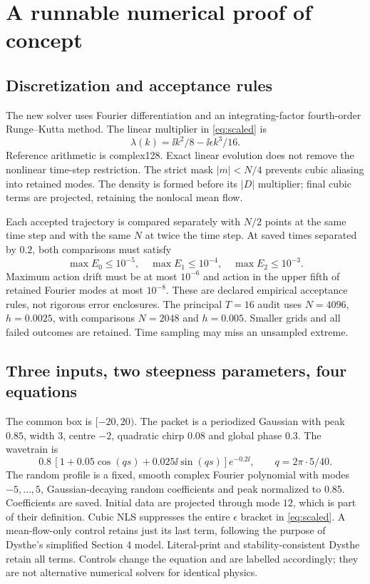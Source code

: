 \section{A runnable numerical proof of concept}\label{sec:numerics}
\subsection{Discretization and acceptance rules}
The new solver uses Fourier differentiation and an integrating-factor fourth-order Runge--Kutta method. The linear multiplier in \eqref{eq:scaled} is
\[
 \lambda(k)=\ii k^2/8-\ii\epsilon k^3/16.
\]
Reference arithmetic is complex128. Exact linear evolution does not remove the nonlinear time-step restriction. The strict mask $|m|<N/4$ prevents cubic aliasing into retained modes. The density is formed before its $|D|$ multiplier; final cubic terms are projected, retaining the nonlocal mean flow.

Each accepted trajectory is compared separately with $N/2$ points at the same time step and with the same $N$ at twice the time step. At saved times separated by $0.2$, both comparisons must satisfy
\[
\max E_0\le10^{-5},\quad \max E_1\le10^{-4},\quad
\max E_2\le10^{-3}.
\]
Maximum action drift must be at most $10^{-6}$ and action in the upper fifth of retained Fourier modes at most $10^{-8}$. These are declared empirical acceptance rules, not rigorous error enclosures. The principal $T=16$ audit uses $N=4096$, $h=0.0025$, with comparisons $N=2048$ and $h=0.005$. Smaller grids and all failed outcomes are retained. Time sampling may miss an unsampled extreme.

\subsection{Three inputs, two steepness parameters, four equations}
The common box is $[-20,20)$. The packet is a periodized Gaussian with peak $0.85$, width $3$, centre $-2$, quadratic chirp $0.08$ and global phase $0.3$. The wavetrain is
\[
 0.8\,[1+0.05\cos(qs)+0.025\ii\sin(qs)]e^{-0.2\ii},
 \qquad q=2\pi\cdot5/40.
\]
The random profile is a fixed, smooth complex Fourier polynomial with modes $-5,\ldots,5$, Gaussian-decaying random coefficients and peak normalized to $0.85$. Coefficients are saved. Initial data are projected through mode $12$, which is part of their definition.
Cubic NLS suppresses the entire $\epsilon$ bracket in \eqref{eq:scaled}. A mean-flow-only control retains just its last term, following the purpose of Dysthe's simplified Section 4 model. Literal-print and stability-consistent Dysthe retain all terms. Controls change the equation and are labelled accordingly; they are not alternative numerical solvers for identical physics.
\clearpage
